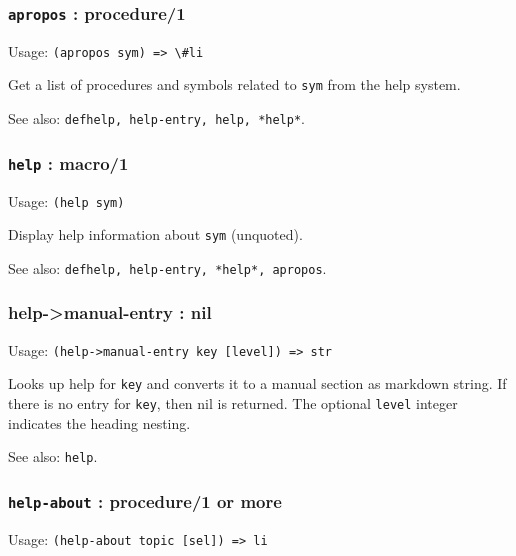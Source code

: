 \documentclass[
]{article}
\newcommand{\passthrough}[1]{#1}
\begin{document}
\hypertarget{apropos-procedure1}{%
\subsubsection{\texorpdfstring{\texttt{apropos} :
procedure/1}{apropos : procedure/1}}\label{apropos-procedure1}}

Usage: \passthrough{\lstinline!(apropos sym) => \#li!}

Get a list of procedures and symbols related to
\passthrough{\lstinline!sym!} from the help system.

See also: \passthrough{\lstinline!defhelp, help-entry, help, *help*!}.

\hypertarget{help-macro1}{%
\subsubsection{\texorpdfstring{\texttt{help} :
macro/1}{help : macro/1}}\label{help-macro1}}

Usage: \passthrough{\lstinline!(help sym)!}

Display help information about \passthrough{\lstinline!sym!} (unquoted).

See also:
\passthrough{\lstinline!defhelp, help-entry, *help*, apropos!}.

\hypertarget{help-manual-entry-nil}{%
\subsubsection{help-\textgreater manual-entry :
nil}\label{help-manual-entry-nil}}

Usage: \passthrough{\lstinline!(help->manual-entry key [level]) => str!}

Looks up help for \passthrough{\lstinline!key!} and converts it to a
manual section as markdown string. If there is no entry for
\passthrough{\lstinline!key!}, then nil is returned. The optional
\passthrough{\lstinline!level!} integer indicates the heading nesting.

See also: \passthrough{\lstinline!help!}.

\hypertarget{help-about-procedure1-or-more}{%
\subsubsection{\texorpdfstring{\texttt{help-about} : procedure/1 or
more}{help-about : procedure/1 or more}}\label{help-about-procedure1-or-more}}

Usage: \passthrough{\lstinline!(help-about topic [sel]) => li!}
\end{document}
